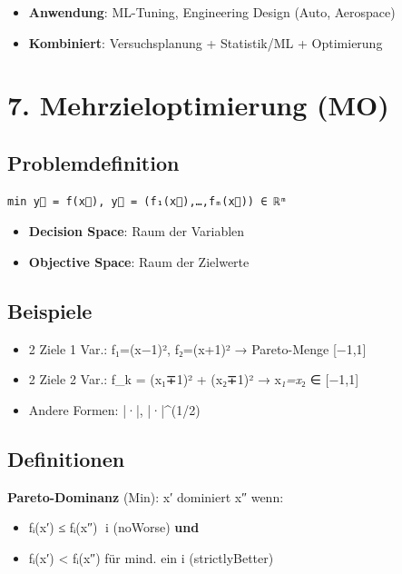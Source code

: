 \documentclass[11pt, a4paper]{article}
\begin{document}
\begin{itemize}
  \item \textbf{Anwendung}: ML-Tuning, Engineering Design (Auto, Aerospace)
  \item \textbf{Kombiniert}: Versuchsplanung + Statistik/ML + Optimierung
\end{itemize}


\section{7. Mehrzieloptimierung (MO)}


\subsection{Problemdefinition}

\begin{lstlisting}
min y⃗ = f(x⃗), y⃗ = (f₁(x⃗),…,fₘ(x⃗)) ∈ ℝᵐ
\end{lstlisting}


\begin{itemize}
  \item \textbf{Decision Space}: Raum der Variablen
  \item \textbf{Objective Space}: Raum der Zielwerte
\end{itemize}


\subsection{Beispiele}
\begin{itemize}
  \item 2 Ziele 1 Var.: f₁=(x−1)², f₂=(x+1)² → Pareto-Menge [−1,1]
  \item 2 Ziele 2 Var.: f\_k = (x₁∓1)² + (x₂∓1)² → x\textit{₁=x}₂ ∈ [−1,1]
  \item Andere Formen: |·|, |·|\textasciicircum{}(1/2)
\end{itemize}


\subsection{Definitionen}

\textbf{Pareto-Dominanz} (Min): x⃗′ dominiert x⃗″ wenn:

\begin{itemize}
  \item fᵢ(x⃗′) ≤ fᵢ(x⃗″) ∀i (noWorse) \textbf{und}
  \item fᵢ(x⃗′) < fᵢ(x⃗″) für mind. ein i (strictlyBetter)
\end{itemize}
\end{document}
